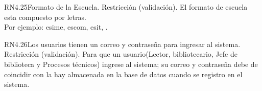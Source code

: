
\begin{BussinesRule}{RN4.25}{Formato de la Escuela.}
	\BRitem[Tipo:] Restricción (validación).
	\BRitem[Descripción:] El formato de escuela esta compuesto por letras.\\
	Por ejemplo: esime, escom, esit, .\\
\end{BussinesRule}


\begin{BussinesRule}{RN4.26}{Los usuarios tienen un correo y contraseña para ingresar al sistema.}
	\BRitem[Tipo:] Restricción (validación).
	\BRitem[Descripción:] Para que un usuario(Lector, bibliotecario, Jefe de biblioteca y Procesos técnicos) ingrese al sistema; su correo y contraseña debe de coincidir con la hay almacenada en la base de datos cuando se registro en el sistema.
\end{BussinesRule}




